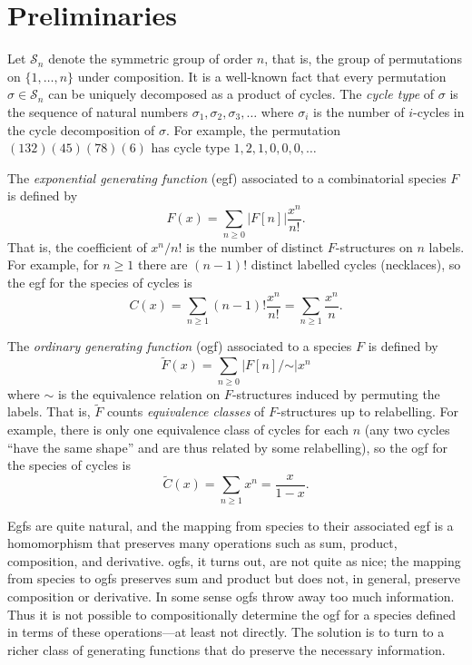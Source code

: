 \documentclass{article}
\renewcommand{\S}{\mathcal{S}}
\begin{document}
\section{Preliminaries}
\label{sec:preliminaries}

Let $\S_n$ denote the symmetric group of order $n$, that is, the group
of permutations on $\{1, \dots, n\}$ under composition.  It is a
well-known fact that every permutation $\sigma \in \S_n$ can be
uniquely decomposed as a product of cycles. The \emph{cycle type} of
$\sigma$ is the sequence of natural numbers $\sigma_1, \sigma_2,
\sigma_3, \dots$ where $\sigma_i$ is the number of $i$-cycles in the
cycle decomposition of $\sigma$.  For example, the permutation
$(132)(45)(78)(6)$ has cycle type $1,2,1,0,0,0,\dots$

The \emph{exponential generating function} (egf) associated to a
combinatorial species $F$ is defined by \[ F(x) = \sum_{n \geq 0}
|F[n]| \frac{x^n}{n!}. \] That is, the coefficient of $x^n/n!$ is the
number of distinct $F$-structures on $n$ labels. For example, for $n
\geq 1$ there are $(n-1)!$ distinct labelled cycles (necklaces), so
the egf for the species of cycles is \[ C(x) = \sum_{n \geq 1} (n-1)!
\frac{x^n}{n!} = \sum_{n \geq 1} \frac{x^n}{n}. \]

The \emph{ordinary generating function} (ogf) associated to a species
$F$ is defined by \[ \tilde F(x) = \sum_{n \geq 0} |F[n]/\mathord{\sim}| x^n \]
where $\sim$ is the equivalence relation on $F$-structures induced by
permuting the labels.  That is, $\tilde F$ counts \emph{equivalence
  classes} of $F$-structures up to relabelling.  For example, there is
only one equivalence class of cycles for each $n$ (any two cycles
``have the same shape'' and are thus related by some relabelling), so
the ogf for the species of cycles is \[ \tilde C(x) = \sum_{n \geq 1}
x^n = \frac{x}{1-x}. \]

Egfs are quite natural, and the mapping from species to their
associated egf is a homomorphism that preserves many operations such
as sum, product, composition, and derivative.  ogfs, it turns out, are
not quite as nice; the mapping from species to ogfs preserves sum and
product but does not, in general, preserve composition or derivative.
In some sense ogfs throw away too much information.  Thus it is not
possible to compositionally determine the ogf for a species defined in
terms of these operations---at least not directly.  The solution is to
turn to a richer class of generating functions that do preserve the
necessary information.
\end{document}
